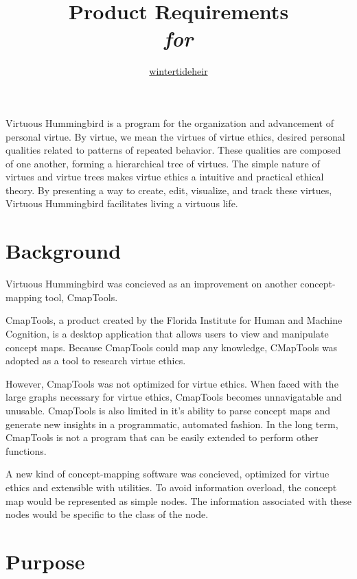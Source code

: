 \documentclass{article}
\title{Product Requirements \\ \textit{for} \\ \name{}}
\author{\href{https://github.com/wintertideheir}{wintertideheir}}
\newcommand{\name}{Virtuous Hummingbird}
\begin{document}
\maketitle

\name{} is a program for the organization and advancement of personal virtue.
By virtue, we mean the virtues of virtue ethics, desired personal qualities related to patterns of repeated behavior.
These qualities are composed of one another, forming a hierarchical tree of virtues. 
The simple nature of virtues and virtue trees makes virtue ethics a intuitive and practical ethical theory.
By presenting a way to create, edit, visualize, and track these virtues, \name{} facilitates living a virtuous life.

\tableofcontents

\section{Background}

\name{} was concieved as an improvement on another concept-mapping tool, CmapTools.

CmapTools, a product created by the Florida Institute for Human and Machine Cognition, is a desktop application that allows users to view and manipulate concept maps.
Because CmapTools could map any knowledge, CMapTools was adopted as a tool to research virtue ethics.

However, CmapTools was not optimized for virtue ethics.
When faced with the large graphs necessary for virtue ethics, CmapTools becomes unnavigatable and unusable.
CmapTools is also limited in it's ability to parse concept maps and generate new insights in a programmatic, automated fashion.
In the long term, CmapTools is not a program that can be easily extended to perform other functions.

A new kind of concept-mapping software was concieved, optimized for virtue ethics and extensible with utilities.
To avoid information overload, the concept map would be represented as simple nodes.
The information associated with these nodes would be specific to the class of the node.

\section{Purpose}
\end{document}
